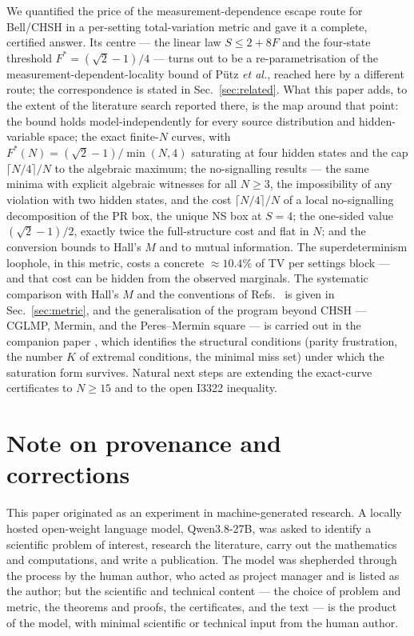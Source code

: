 \documentclass[aps,pra,reprint,superscriptaddress,floatfix]{revtex4-2}
\begin{document}
We quantified the price of the measurement-dependence escape route for
Bell/CHSH in a per-setting total-variation metric and gave it a complete,
certified answer. Its centre --- the linear law $S\le2+8F$ and the
four-state threshold $F^*=(\sqrt2-1)/4$ --- turns out to be a
re-parametrisation of the measurement-dependent-locality bound of P\"utz
\emph{et al.}, reached here by a different route; the correspondence is
stated in Sec.~\ref{sec:related}. What this paper adds, to the extent of
the literature search reported there, is the map around that point: the
bound holds model-independently for every source distribution and
hidden-variable space; the exact finite-$N$ curves, with
$F^*(N)=(\sqrt2-1)/\min(N,4)$ saturating at four hidden states and the cap
$\lceil N/4\rceil/N$ to the algebraic maximum; the no-signalling results
--- the same minima with explicit algebraic witnesses for all $N\ge3$, the
impossibility of any violation with two hidden states, and the cost
$\lceil N/4\rceil/N$ of a local no-signalling decomposition of the PR box,
the unique NS box at $S=4$; the one-sided value $(\sqrt2-1)/2$, exactly
twice the full-structure cost and flat in $N$; and the conversion bounds
to Hall's $M$ and to mutual information. The superdeterminism loophole,
in this metric, costs a concrete $\approx10.4\%$ of TV per settings block
--- and that cost can be hidden from the observed marginals. The
systematic comparison with
Hall's $M$ and the conventions of Refs.~ is given in Sec.~\ref{sec:metric}, and the
generalisation of the program beyond CHSH --- CGLMP, Mermin, and the
Peres--Mermin square --- is carried out in the companion paper
\cite{companion2026}, which identifies the structural conditions
(parity frustration, the number $K$ of extremal conditions, the minimal
miss set) under which the saturation form survives. Natural next steps are
extending the exact-curve certificates to $N\ge15$ and to the open I3322
inequality.

\section*{Note on provenance and corrections}
\label{sec:provenance}

This paper originated as an experiment in machine-generated research. A
locally hosted open-weight language model, Qwen3.8-27B, was asked to identify
a scientific problem of interest, research the literature, carry out the
mathematics and computations, and write a publication. The model was
shepherded through the process by the human author, who acted as project
manager and is listed as the author; but the scientific and technical
content --- the choice of problem and metric, the theorems and proofs, the
certificates, and the text --- is the product of the model, with minimal
scientific or technical input from the human author.
\end{document}
